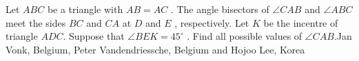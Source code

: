 Let $ ABC$ be a triangle with $ AB = AC$ . The angle bisectors of $ \angle C AB$ and $ \angle AB C$ meet the sides $ B C$ and $ C A$ at $ D$ and $ E$ , respectively. Let $ K$ be the incentre of triangle $ ADC$. Suppose that $ \angle B E K = 45^\circ$ . Find all possible values of $ \angle C AB$.Jan Vonk, Belgium, Peter Vandendriessche, Belgium and Hojoo Lee, Korea 